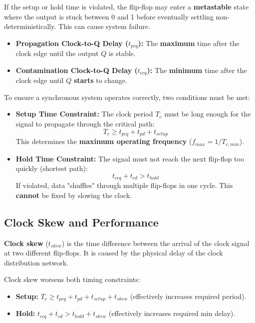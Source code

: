 \begin{important}
If the setup or hold time is violated, the flip-flop may enter a \textbf{metastable} state where the output is stuck between 0 and 1 before eventually settling non-deterministically. This can cause system failure.
\end{important}

\begin{definition}
\begin{itemize}
    \item \textbf{Propagation Clock-to-Q Delay ($t_{pcq}$):} The \textbf{maximum} time after the clock edge until the output $Q$ is stable.
    \item \textbf{Contamination Clock-to-Q Delay ($t_{ccq}$):} The \textbf{minimum} time after the clock edge until $Q$ \textbf{starts} to change.
\end{itemize}
\end{definition}

\begin{theorem}
To ensure a synchronous system operates correctly, two conditions must be met:
\begin{itemize}
    \item \textbf{Setup Time Constraint:} The clock period $T_c$ must be long enough for the signal to propagate through the critical path:
    $$T_c \geq t_{pcq} + t_{pd} + t_{setup}$$
    This determines the \textbf{maximum operating frequency} ($f_{max} = 1/T_{c,min}$).
    \item \textbf{Hold Time Constraint:} The signal must not reach the next flip-flop too quickly (shortest path):
    $$t_{ccq} + t_{cd} > t_{hold}$$
    If violated, data "shuffles" through multiple flip-flops in one cycle. This \textbf{cannot} be fixed by slowing the clock.
\end{itemize}
\end{theorem}

\subsection{Clock Skew and Performance}

\begin{definition}
\textbf{Clock skew} ($t_{skew}$) is the time difference between the arrival of the clock signal at two different flip-flops. It is caused by the physical delay of the clock distribution network.
\end{definition}

\begin{important}
Clock skew worsens both timing constraints:
\begin{itemize}
    \item \textbf{Setup:} $T_c \geq t_{pcq} + t_{pd} + t_{setup} + t_{skew}$ (effectively increases required period).
    \item \textbf{Hold:} $t_{ccq} + t_{cd} > t_{hold} + t_{skew}$ (effectively increases required min delay).
\end{itemize}
\end{important}